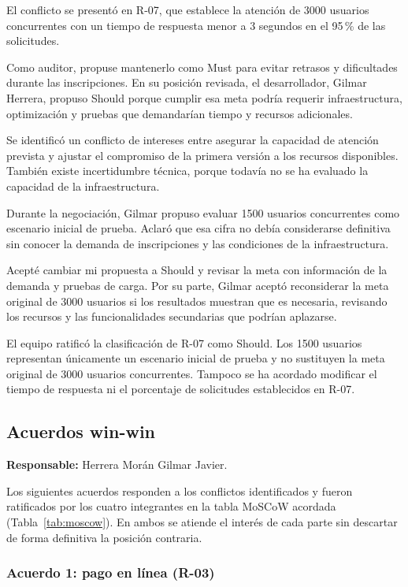 \documentclass[12pt,a4paper]{article}
\begin{document}
El conflicto se presentó en R-07, que establece la
atención de 3000 usuarios concurrentes con un tiempo
de respuesta menor a 3 segundos en el 95\,\% de
las solicitudes.

Como auditor, propuse mantenerlo como Must para
evitar retrasos y dificultades durante las inscripciones.
En su posición revisada, el desarrollador, Gilmar Herrera,
propuso Should porque cumplir esa meta podría requerir
infraestructura, optimización y pruebas que demandarían
tiempo y recursos adicionales.

Se identificó un conflicto de intereses entre asegurar
la capacidad de atención prevista y ajustar el compromiso
de la primera versión a los recursos disponibles.
También existe incertidumbre técnica, porque todavía
no se ha evaluado la capacidad de la infraestructura.

Durante la negociación, Gilmar propuso evaluar
1500 usuarios concurrentes como escenario inicial
de prueba. Aclaró que esa cifra no debía considerarse
definitiva sin conocer la demanda de inscripciones
y las condiciones de la infraestructura.

Acepté cambiar mi propuesta a Should y revisar la
meta con información de la demanda y pruebas de carga.
Por su parte, Gilmar aceptó reconsiderar la meta
original de 3000 usuarios si los resultados muestran
que es necesaria, revisando los recursos y las
funcionalidades secundarias que podrían aplazarse.

El equipo ratificó la clasificación de R-07 como Should.
Los 1500 usuarios representan únicamente un escenario
inicial de prueba y no sustituyen la meta original
de 3000 usuarios concurrentes. Tampoco se ha acordado
modificar el tiempo de respuesta ni el porcentaje
de solicitudes establecidos en R-07.

\subsection{Acuerdos win-win}

\textbf{Responsable:} Herrera Morán Gilmar Javier.

Los siguientes acuerdos responden a los conflictos
identificados y fueron ratificados por los cuatro
integrantes en la tabla MoSCoW acordada
(Tabla~\ref{tab:moscow}). En ambos se atiende el interés
de cada parte sin descartar de forma definitiva la
posición contraria.

\subsubsection{Acuerdo 1: pago en línea (R-03)}
\end{document}
